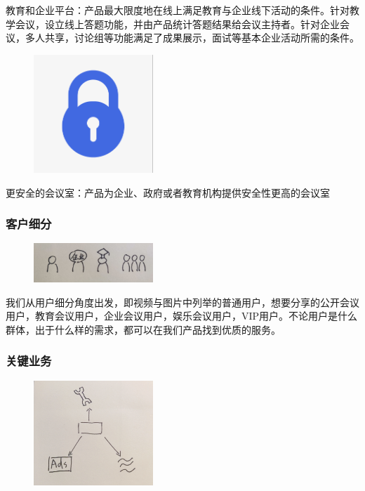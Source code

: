 \documentclass[a4paper,12pt]{article}
\begin{document}
    教育和企业平台：产品最大限度地在线上满足教育与企业线下活动的条件。针对教学会议，设立线上答题功能，并由产品统计答题结果给会议主持者。针对企业会议，多人共享，讨论组等功能满足了成果展示，面试等基本企业活动所需的条件。

    \begin{figure}[H]
        \centering
        \includegraphics[width=0.4\textwidth]{安全的会议室.png}
    \end{figure}

    更安全的会议室：产品为企业、政府或者教育机构提供安全性更高的会议室
    \subsubsection{客户细分}

    \begin{figure}[H]
        \centering
        \includegraphics[width=0.4\textwidth]{客户细分.jpg}
    \end{figure}

    我们从用户细分角度出发，即视频与图片中列举的普通用户，想要分享的公开会议用户，教育会议用户，企业会议用户，娱乐会议用户，VIP用户。不论用户是什么群体，出于什么样的需求，都可以在我们产品找到优质的服务。
    \subsubsection{关键业务}

    \begin{figure}[H]
        \centering
        \includegraphics[width=0.4\textwidth]{关键业务.png}
    \end{figure}
    
\end{document}
